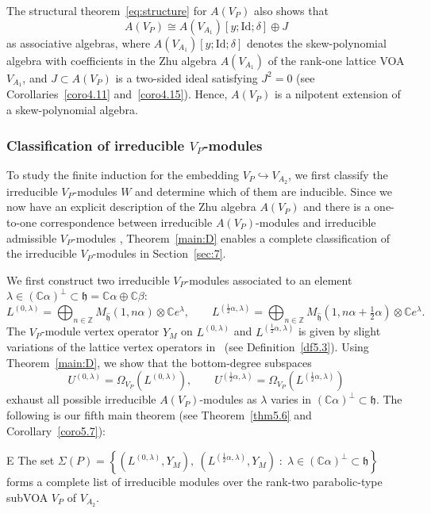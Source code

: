\documentclass[12pt,a4paper,reqno]{amsart}
\numberwithin{equation}{section}
\numberwithin{equation}{section}
\theoremstyle{definition}
\newcommand{\Z}{\mathbb{Z}}
\def \C {\mathbb{C}}
\def\la{\lambda}
\def \al{\alpha}
\def \b {\beta}
\def \op {\oplus}
\def \h {\mathfrak{h}}
\def\Id{\mathrm{Id}}
\def\Om{\Omega}
\begin{document}
The structural theorem~\eqref{eq:structure} for $A(V_P)$ also shows that 
\[
A(V_P)\cong A(V_{A_1})[y; \Id;\delta]\op J
\]
as associative algebras, where $A(V_{A_1})[y; \Id;\delta]$ denotes the skew-polynomial algebra \cite{GW04,O33} with coefficients in the Zhu algebra $A(V_{A_1})$ of the rank-one lattice VOA $V_{A_1}$, and $J\subset A(V_P)$ is a two-sided ideal satisfying $J^2=0$ (see Corollaries~\ref{coro4.11} and~\ref{coro4.15}). Hence, $A(V_P)$ is a nilpotent extension of a skew-polynomial algebra. 

\subsubsection{Classification of irreducible $V_P$-modules}
To study the finite induction for the embedding $V_P\hookrightarrow V_{A_2}$, we first classify the irreducible $V_P$-modules $W$ and determine which of them are inducible. Since we now have an explicit description of the Zhu algebra $A(V_P)$ and there is a one-to-one correspondence between irreducible $A(V_P)$-modules and irreducible admissible $V_P$-modules \cite[Theorem~2.2.2]{Z}, Theorem~\ref{main:D} enables a complete classification of the irreducible $V_P$-modules in Section~\ref{sec:7}. 

We first construct two irreducible $V_P$-modules associated to an element $\la\in (\C\al)^\perp\subset \h=\C\al\oplus \C\b$:
\[
L^{(0,\la)}=\bigoplus_{n\in \Z} M_{\hat{\h}}(1,n\al)\otimes \C e^\la,\qquad 
L^{(\frac{1}{2}\al,\la)}=\bigoplus_{n\in \Z} M_{\hat{\h}}(1,n\al+\tfrac{1}{2}\al)\otimes \C e^\la.
\]
The $V_P$-module vertex operator $Y_M$ on $L^{(0,\la)}$ and $L^{(\frac{1}{2}\al,\la)}$ is given by slight variations of the lattice vertex operators in~\cite{FLM} (see Definition~\ref{df5.3}). Using Theorem~\ref{main:D}, we show that the bottom-degree subspaces
\[
U^{(0,\la)}=\Om_{V_P}(L^{(0,\la)}),\qquad 
U^{(\frac{1}{2}\al,\la)}=\Om_{V_P}(L^{(\frac{1}{2}\al,\la)})
\]
exhaust all possible irreducible $A(V_P)$-modules as $\la$ varies in $(\C\al)^\perp\subset \h$. The following is our fifth main theorem (see Theorem~\ref{thm5.6} and Corollary~\ref{coro5.7}):

\begin{customthm}{E}\label{main:E}
	The set
$
	\Sigma(P)=\left\{ (L^{(0,\la)},Y_M),\ (L^{(\frac{1}{2}\al,\la)},Y_M)\; :\; \la\in (\C\al)^\perp\subset \h \right\}
$	forms a complete list of irreducible modules over the rank-two parabolic-type subVOA $V_P$ of $V_{A_2}$. 
\end{customthm}
\end{document}
